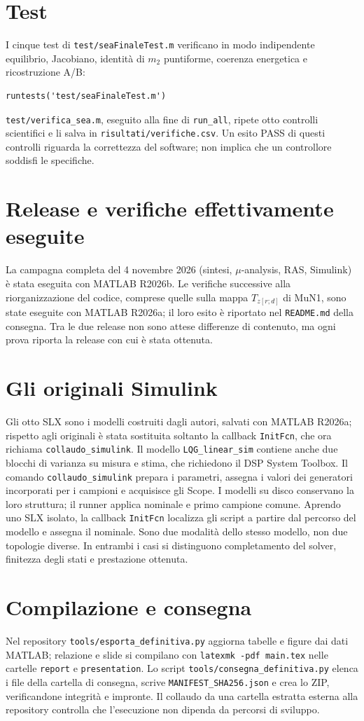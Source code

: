 \section{Test}
I cinque test di \texttt{test/seaFinaleTest.m} verificano in modo
indipendente equilibrio, Jacobiano, identità di $m_2$ puntiforme,
coerenza energetica e ricostruzione A/B:
\begin{lstlisting}
runtests('test/seaFinaleTest.m')
\end{lstlisting}
\texttt{test/verifica\_sea.m}, eseguito alla fine di \texttt{run\_all},
ripete otto controlli scientifici e li salva in
\texttt{risultati/verifiche.csv}. Un esito PASS di questi controlli
riguarda la correttezza del software; non implica che un controllore
soddisfi le specifiche.

\section{Release e verifiche effettivamente eseguite}
La campagna completa del 4 novembre 2026 (sintesi, $\mu$-analysis, RAS,
Simulink) è stata eseguita con MATLAB R2026b. Le verifiche successive
alla riorganizzazione del codice, comprese quelle sulla mappa
$T_{z[r;d]}$ di MuN1, sono state eseguite con MATLAB R2026a; il loro
esito è riportato nel \texttt{README.md} della consegna. Tra le due
release non sono attese differenze di contenuto, ma ogni prova riporta
la release con cui è stata ottenuta.

\section{Gli originali Simulink}
Gli otto SLX sono i modelli costruiti dagli autori, salvati con MATLAB
R2026a; rispetto agli originali è stata sostituita soltanto la callback
\texttt{InitFcn}, che ora richiama \texttt{collaudo\_simulink}. Il
modello \texttt{LQG\_linear\_sim} contiene anche due blocchi di varianza
su misura e stima, che richiedono il DSP System Toolbox.
Il comando \texttt{collaudo\_simulink} prepara i parametri, assegna i
valori dei generatori incorporati per i campioni e acquisisce gli Scope.
I modelli su disco conservano la loro struttura; il runner applica
nominale e primo campione comune. Aprendo uno SLX isolato, la callback
\texttt{InitFcn} localizza gli script a partire dal percorso del modello
e assegna il nominale. Sono due modalità dello stesso modello, non due
topologie diverse. In entrambi i casi si distinguono completamento del
solver, finitezza degli stati e prestazione ottenuta.

\section{Compilazione e consegna}
Nel repository \texttt{tools/esporta\_definitiva.py} aggiorna tabelle e
figure dai dati MATLAB; relazione e slide si compilano con
\texttt{latexmk -pdf main.tex} nelle cartelle \texttt{report} e
\texttt{presentation}. Lo script \texttt{tools/consegna\_definitiva.py}
elenca i file della cartella di consegna, scrive
\texttt{MANIFEST\_SHA256.json} e crea lo ZIP, verificandone integrità e
impronte. Il collaudo da una cartella estratta esterna alla repository
controlla che l'esecuzione non dipenda da percorsi di sviluppo.
